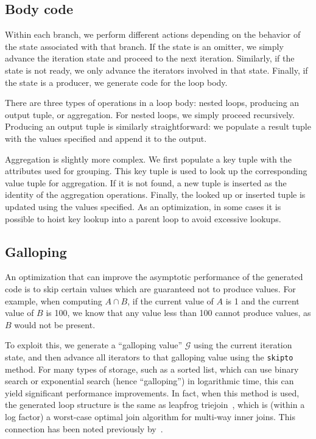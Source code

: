 \documentclass[acmsmall,screen,nonacm]{acmart}\settopmatter{printfolios=true,printccs=false,printacmref=false}
\newcommand*{\gallopV}{\mathcal{G}}
\begin{document}
\subsection{Body code}

Within each branch, we perform different actions depending on the
behavior of the state associated with that branch. If the state is an
omitter, we simply advance the iteration state and proceed to the next
iteration. Similarly, if the state is not ready, we only advance the
iterators involved in that state. Finally, if the state is a producer,
we generate code for the loop body.

There are three types of operations in a loop body: nested
loops, producing an output tuple, or aggregation.
For nested loops, we simply proceed recursively.
Producing an output tuple is similarly straightforward: we populate
a result tuple with the values specified and append it to the output.

Aggregation is slightly more complex. We first populate a key tuple
with the attributes used for grouping. This key tuple is used to look
up the corresponding value tuple for aggregation. If it is not found,
a new tuple is inserted as the identity of the aggregation operations.
Finally, the looked up or inserted tuple is updated using the values
specified. As an optimization, in some cases it is possible to hoist
key lookup into a parent loop to avoid excessive lookups.

\subsection{Galloping}
\label{subsec:galloping}

An optimization that can improve the asymptotic performance of the
generated code is to skip certain values which are guaranteed not to
produce values. For example, when computing $A \cap B$, if the
current value of $A$ is 1 and the current value of $B$ is 100, we know
that any value less than 100 cannot produce values, as $B$ would not
be present.

To exploit this, we generate a ``galloping value'' $\gallopV$ using
the current iteration state, and then advance all iterators to that
galloping value using the \texttt{skipto} method. For many types of
storage, such as a sorted list, which can use binary search or
exponential search (hence ``galloping'') in logarithmic time, this can
yield significant performance improvements.
In fact, when this method is used, the generated loop structure is the
same as leapfrog triejoin~\cite{leapfrog-triejoin}, which is (within a log factor) a
worst-case optimal join algorithm for multi-way inner joins.
This connection has been noted previously by~\citet{indexed-streams}.
\end{document}
